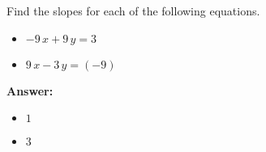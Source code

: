 Find the slopes for each of the following equations. \begin{itemize}\item \( -9 \, x + 9 \, y = 3 \)\item \( 9 \, x - 3 \, y = \left(-9\right) \)\end{itemize}

        \textbf{Answer:} \begin{itemize}\item \( 1 \)\item \( 3 \)\end{itemize}
